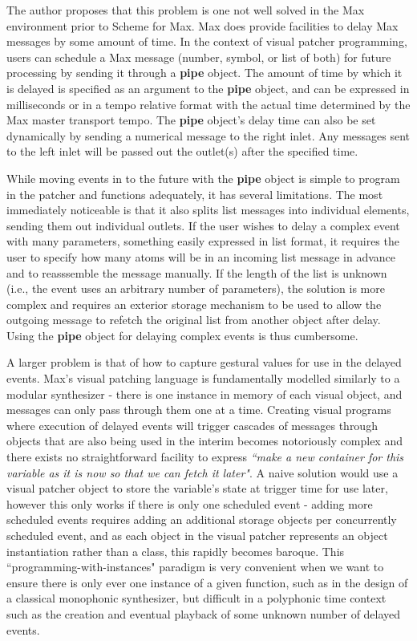 \documentclass[acmsmall]{acmart}
\begin{document}
The author proposes that this problem is one not well solved in the Max environment prior 
to Scheme for Max. Max does provide facilities to delay Max messages by some
amount of time. In the context of visual patcher programming, users can schedule 
a Max message (number, symbol, or list of both) for future processing by sending it through a 
\textbf{pipe} object. The amount of time by which it is delayed is specified as an argument to 
the \textbf{pipe} object, and can be expressed in milliseconds or in a tempo 
relative format with the actual time determined by the Max master transport tempo. 
The \textbf{pipe} object’s delay time can also be set dynamically by sending a numerical message
to the right inlet. Any messages sent to the left inlet will be passed out
the outlet(s) after the specified time. 

While moving events in to the future with the \textbf{pipe} object is simple to program 
in the patcher and functions adequately, 
it has several limitations. The most immediately noticeable is that it also splits 
list messages into individual elements, sending them out individual outlets. 
If the user wishes to delay a complex event with many parameters, something easily 
expressed in list format, it requires the user to specify how many atoms will 
be in an incoming list message in advance and to reasssemble the message manually.
If the length of the list is unknown (i.e., the event uses an arbitrary number
of parameters), the solution is more complex and requires 
an exterior storage mechanism to be used to allow the outgoing 
message to refetch the original list from another object after delay. Using
the \textbf{pipe} object for delaying complex events is thus cumbersome. 

A larger problem is that of how to capture gestural values for use in the delayed
events. Max's visual patching language is fundamentally modelled similarly to a modular
synthesizer - there is one instance in memory of each visual object, and messages can only
pass through them one at a time. Creating visual programs where execution of 
delayed events will trigger cascades of messages through objects that are also 
being used in the interim becomes notoriously complex and there exists no straightforward
facility to express \textit{``make a new container for this variable as it is now so that
we can fetch it later"}. A naive solution would use a visual patcher object to store 
the variable's state at trigger time for use later, however this only works
if there is only one scheduled event - adding more scheduled events requires adding
an additional storage objects per concurrently scheduled event, and as each object in the visual patcher
represents an object instantiation rather than a class, this rapidly becomes
baroque. This ``programming-with-instances" paradigm
is very convenient when we want to ensure there is only ever one instance of a given function, such
as in the design of a classical monophonic synthesizer, but difficult in a polyphonic time context
such as the creation and eventual playback of some unknown number of delayed events.
\end{document}
